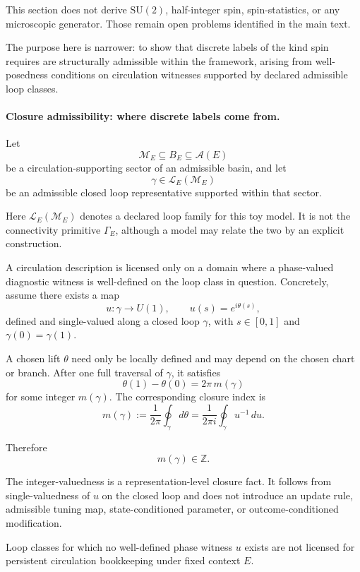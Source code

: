 \documentclass[aps,prx,onecolumn,11pt]{revtex4-2}
\theoremstyle{plain}
\theoremstyle{definition}
\theoremstyle{remark}
\begin{document}
This section does not derive \(\mathrm{SU}(2)\), half-integer spin,
spin-statistics, or any microscopic generator. Those remain open
problems identified in the main text.

The purpose here is narrower: to show that discrete labels of the kind
spin requires are structurally admissible within the framework, arising
from well-posedness conditions on circulation witnesses supported by
declared admissible loop classes.

\paragraph{Closure admissibility: where discrete labels come from.}

Let
\[
\mathcal M_E
\subseteq
B_E
\subseteq
\mathcal A(E)
\]
be a circulation-supporting sector of an admissible basin, and let
\[
\gamma
\in
\mathcal L_E(\mathcal M_E)
\]
be an admissible closed loop representative supported within that
sector.

Here \(\mathcal L_E(\mathcal M_E)\) denotes a declared loop family for
this toy model. It is not the connectivity primitive \(\Gamma_E\),
although a model may relate the two by an explicit construction.

A circulation description is licensed only on a domain where a
phase-valued diagnostic witness is well-defined on the loop class in
question. Concretely, assume there exists a map
\[
u:\gamma\to U(1),
\qquad
u(s)=e^{i\theta(s)},
\]
defined and single-valued along a closed loop \(\gamma\), with
\(s\in[0,1]\) and \(\gamma(0)=\gamma(1)\).

A chosen lift \(\theta\) need only be locally defined and may depend on
the chosen chart or branch. After one full traversal of \(\gamma\), it
satisfies
\[
\theta(1)-\theta(0)
=
2\pi\,m(\gamma)
\]
for some integer \(m(\gamma)\). The corresponding closure index is
\begin{equation}
m(\gamma)
:=
\frac{1}{2\pi}
\oint_\gamma d\theta
=
\frac{1}{2\pi i}
\oint_\gamma u^{-1}\,du.
\label{eq:winding_integer}
\end{equation}

Therefore
\[
m(\gamma)\in\mathbb Z.
\]

The integer-valuedness is a representation-level closure fact. It
follows from single-valuedness of \(u\) on the closed loop and does not
introduce an update rule, admissible tuning map, state-conditioned
parameter, or outcome-conditioned modification.

Loop classes for which no well-defined phase witness \(u\) exists are
not licensed for persistent circulation bookkeeping under fixed context
\(E\).
\end{document}

